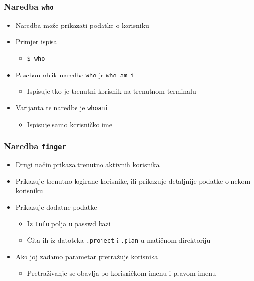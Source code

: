 \documentclass[table,usenames,dvipsnames] {beamer}
\newcommand{\shell}[1]{\texttt{#1}}
\begin{document}
\begin{frame}[t]
\frametitle{Naredba \shell{who}}
\begin{itemize}
  \item Naredba može prikazati podatke o korisniku
  \item Primjer ispisa
  \begin{itemize}
    \item[] \shell{\$ who}
    \begin{table}[h]
    \end{table}
  \end{itemize}
  \item Poseban oblik naredbe \shell{who} je \shell{who am i}
  \begin{itemize}
    \item Ispisuje tko je trenutni korisnik na trenutnom terminalu
  \end{itemize}
  \item Varijanta te naredbe je \shell{whoami}
  \begin{itemize}
    \item Ispisuje samo korisničko ime
  \end{itemize}
\end{itemize}
\end{frame}

\begin{frame}[t]
\frametitle{Naredba \shell{finger}}
\begin{itemize}
  \item Drugi način prikaza trenutno aktivnih korisnika
  \item Prikazuje trenutno logirane korisnike, ili prikazuje 
          detaljnije podatke o nekom korisniku
\end{itemize}
\begin{itemize}
   \item Prikazuje dodatne podatke
   \begin{itemize}
   	\item Iz \shell{Info} polja u passwd bazi
   	\item Čita ih iz datoteka \shell{.project} i \shell{.plan} u matičnom direktoriju
   \end{itemize}
   \item Ako joj zadamo parametar pretražuje korisnika
   \begin{itemize}
   	\item Pretraživanje se obavlja po korisničkom imenu i pravom imenu
   \end{itemize}
\end{itemize}
\end{frame}
\end{document}
